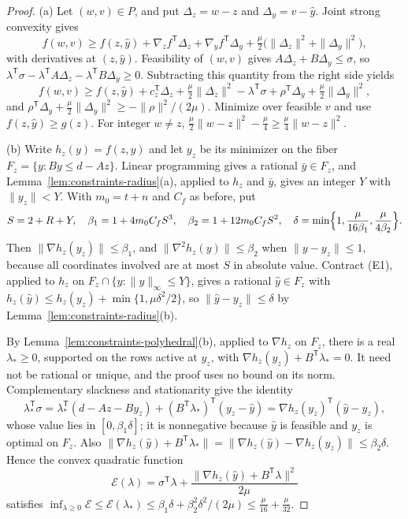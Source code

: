 \begin{proof}
(a) Let $(w,v)\in P$, and put $\Delta_z=w-z$ and $\Delta_y=v-\hat y$. Joint
strong convexity gives
\[
 f(w,v)\ge f(z,\hat y)+\nabla_zf^{\mathsf T}\Delta_z+\nabla_yf^{\mathsf T}\Delta_y
 +\tfrac\mu2\bigl(\|\Delta_z\|^2+\|\Delta_y\|^2\bigr),
\]
with derivatives at $(z,\hat y)$. Feasibility of $(w,v)$ gives
$A\Delta_z+B\Delta_y\le\sigma$, so
$\lambda^{\mathsf T}\sigma-\lambda^{\mathsf T}A\Delta_z-\lambda^{\mathsf T}B\Delta_y\ge0$.
Subtracting this quantity from the right side yields
\[
 f(w,v)\ge f(z,\hat y)+c_z^{\mathsf T}\Delta_z+\tfrac\mu2\|\Delta_z\|^2
 -\lambda^{\mathsf T}\sigma+\rho^{\mathsf T}\Delta_y+\tfrac\mu2\|\Delta_y\|^2,
\]
and $\rho^{\mathsf T}\Delta_y+\frac\mu2\|\Delta_y\|^2\ge-\|\rho\|^2/(2\mu)$.
Minimize over feasible $v$ and use $f(z,\hat y)\ge g(z)$. For integer $w\ne z$,
$\frac\mu2\|w-z\|^2-\frac\mu4\ge\frac\mu4\|w-z\|^2$.

(b) Write $h_z(y)=f(z,y)$ and let $y_z$ be its minimizer on the fiber
$F_z=\{y:By\le d-Az\}$. Linear programming gives a rational $\bar y\in F_z$,
and Lemma~\ref{lem:constraints-radius}(a), applied to $h_z$ and $\bar y$,
gives an integer $Y$ with $\|y_z\|<Y$. With $m_0=t+n$ and $C_f$ as before, put
\[
 S=2+R+Y,\quad \beta_1=1+4m_0C_fS^3,\quad \beta_2=1+12m_0C_fS^2,\quad
 \delta=\min\Bigl\{1,\frac{\mu}{16\beta_1},\frac{\mu}{4\beta_2}\Bigr\}.
\]
Then $\|\nabla h_z(y_z)\|\le\beta_1$, and $\|\nabla^2h_z(y)\|\le\beta_2$ when
$\|y-y_z\|\le1$, because all coordinates involved are at most $S$ in absolute
value. Contract (E1), applied to $h_z$ on $F_z\cap\{y:\|y\|_\infty\le Y\}$,
gives a rational $\hat y\in F_z$ with
$h_z(\hat y)\le h_z(y_z)+\min\{1,\mu\delta^2/2\}$, so
$\|\hat y-y_z\|\le\delta$ by Lemma~\ref{lem:constraints-radius}(b).

By Lemma~\ref{lem:constraints-polyhedral}(b), applied to $\nabla h_z$ on $F_z$,
there is a real $\lambda_*\ge0$, supported on the rows active at $y_z$, with
$\nabla h_z(y_z)+B^{\mathsf T}\lambda_*=0$. It need not be rational or
unique, and the proof uses no bound on its norm. Complementary slackness and
stationarity give the identity
\[
 \lambda_*^{\mathsf T}\sigma
 =\lambda_*^{\mathsf T}(d-Az-By_z)+(B^{\mathsf T}\lambda_*)^{\mathsf T}(y_z-\hat y)
 =\nabla h_z(y_z)^{\mathsf T}(\hat y-y_z),
\]
whose value lies in $[0,\beta_1\delta]$; it is nonnegative because $\hat y$ is
feasible and $y_z$ is optimal on $F_z$. Also
$\|\nabla h_z(\hat y)+B^{\mathsf T}\lambda_*\|=\|\nabla h_z(\hat y)-\nabla h_z(y_z)\|\le\beta_2\delta$.
Hence the convex quadratic function
\[
 \mathcal E(\lambda)=\sigma^{\mathsf T}\lambda
 +\frac{\|\nabla h_z(\hat y)+B^{\mathsf T}\lambda\|^2}{2\mu}
\]
satisfies
$\inf_{\lambda\ge0}\mathcal E\le\mathcal E(\lambda_*)\le\beta_1\delta+\beta_2^2\delta^2/(2\mu)\le\frac\mu{16}+\frac\mu{32}$.


\end{proof}
